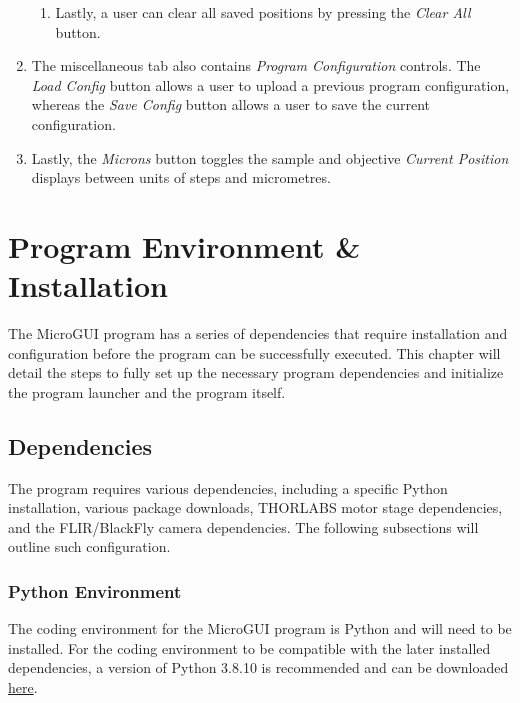 \documentclass[a4paper, 12pt]{report}
\begin{document}
\begin{enumerate}
\begin{enumerate}
            \item Lastly, a user can clear all saved positions by pressing the \textit{Clear All} button.
        \end{enumerate}
        \item The miscellaneous tab also contains \textit{Program Configuration} controls. The \textit{Load Config} button allows a user to upload a previous program configuration, whereas the \textit{Save Config} button allows a user to save the current configuration.
        \item Lastly, the \textit{Microns} button toggles the sample and objective \textit{Current Position} displays between units of steps and micrometres.
    \end{enumerate}
    
    
    
    
    \chapter{Program Environment \& Installation}
    
    The MicroGUI program has a series of dependencies that require installation and configuration before the program can be successfully executed. This chapter will detail the steps to fully set up the necessary program dependencies and initialize the program launcher and the program itself.
    
    \section{Dependencies}
    The program requires various dependencies, including a specific Python installation, various package downloads, THORLABS motor stage dependencies, and the FLIR/BlackFly camera dependencies. The following subsections will outline such configuration.

    \subsection{Python Environment}\label{PYTHONconfig}
    The coding environment for the MicroGUI program is Python and will need to be installed. For the coding environment to be compatible with the later installed dependencies, a version of Python 3.8.10 is recommended and can be downloaded \href{https://www.python.org/downloads/release/python-3810/}{here}.
    
\end{document}
